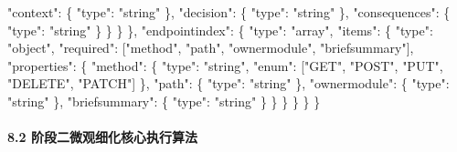 \documentclass[
]{ctexart}
\newenvironment{Shaded}{}{}
\newcommand{\DataTypeTok}[1]{\textcolor[rgb]{0.56,0.13,0.00}{#1}}
\newcommand{\FunctionTok}[1]{\textcolor[rgb]{0.02,0.16,0.49}{#1}}
\newcommand{\OtherTok}[1]{\textcolor[rgb]{0.00,0.44,0.13}{#1}}
\newcommand{\StringTok}[1]{\textcolor[rgb]{0.25,0.44,0.63}{#1}}
\renewcommand{\_}{\discretionary{}{}{\textunderscore}}
\begin{document}
\begin{Shaded}
\begin{Highlighting}[]
          \DataTypeTok{"context"}\FunctionTok{:} \FunctionTok{\{} \DataTypeTok{"type"}\FunctionTok{:} \StringTok{"string"} \FunctionTok{\},}
          \DataTypeTok{"decision"}\FunctionTok{:} \FunctionTok{\{} \DataTypeTok{"type"}\FunctionTok{:} \StringTok{"string"} \FunctionTok{\},}
          \DataTypeTok{"consequences"}\FunctionTok{:} \FunctionTok{\{} \DataTypeTok{"type"}\FunctionTok{:} \StringTok{"string"} \FunctionTok{\}}
        \FunctionTok{\}}
      \FunctionTok{\}}
    \FunctionTok{\},}
    \DataTypeTok{"endpoint\_index"}\FunctionTok{:} \FunctionTok{\{}
      \DataTypeTok{"type"}\FunctionTok{:} \StringTok{"array"}\FunctionTok{,}
      \DataTypeTok{"items"}\FunctionTok{:} \FunctionTok{\{}
        \DataTypeTok{"type"}\FunctionTok{:} \StringTok{"object"}\FunctionTok{,}
        \DataTypeTok{"required"}\FunctionTok{:} \OtherTok{[}\StringTok{"method"}\OtherTok{,} \StringTok{"path"}\OtherTok{,} \StringTok{"owner\_module"}\OtherTok{,} \StringTok{"brief\_summary"}\OtherTok{]}\FunctionTok{,}
        \DataTypeTok{"properties"}\FunctionTok{:} \FunctionTok{\{}
          \DataTypeTok{"method"}\FunctionTok{:} \FunctionTok{\{} \DataTypeTok{"type"}\FunctionTok{:} \StringTok{"string"}\FunctionTok{,} \DataTypeTok{"enum"}\FunctionTok{:} \OtherTok{[}\StringTok{"GET"}\OtherTok{,} \StringTok{"POST"}\OtherTok{,} \StringTok{"PUT"}\OtherTok{,} \StringTok{"DELETE"}\OtherTok{,} \StringTok{"PATCH"}\OtherTok{]} \FunctionTok{\},}
          \DataTypeTok{"path"}\FunctionTok{:} \FunctionTok{\{} \DataTypeTok{"type"}\FunctionTok{:} \StringTok{"string"} \FunctionTok{\},}
          \DataTypeTok{"owner\_module"}\FunctionTok{:} \FunctionTok{\{} \DataTypeTok{"type"}\FunctionTok{:} \StringTok{"string"} \FunctionTok{\},}
          \DataTypeTok{"brief\_summary"}\FunctionTok{:} \FunctionTok{\{} \DataTypeTok{"type"}\FunctionTok{:} \StringTok{"string"} \FunctionTok{\}}
        \FunctionTok{\}}
      \FunctionTok{\}}
    \FunctionTok{\}}
  \FunctionTok{\}}
\FunctionTok{\}}
\end{Highlighting}
\end{Shaded}

\paragraph{8.2
阶段二微观细化核心执行算法}\label{ux9636ux6bb5ux4e8cux5faeux89c2ux7ec6ux5316ux6838ux5fc3ux6267ux884cux7b97ux6cd5}
\end{document}
